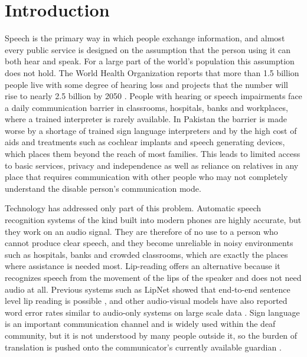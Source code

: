 \documentclass{FastFyp}
\begin{document}
\mainmatter


\chapter{Introduction}
\label{ch:intro}
Speech is the primary way in which people exchange information, and almost every public service is designed on the assumption that the person using it can both hear and speak. For a large part of the world's population this assumption does not hold. The World Health Organization reports that more than 1.5 billion people live with some degree of hearing loss and projects that the number will rise to nearly 2.5 billion by 2050 \cite{who2021}. People with hearing or speech impairments face a daily communication barrier in classrooms, hospitals, banks and workplaces, where a trained interpreter is rarely available. In Pakistan the barrier is made worse by a shortage of trained sign language interpreters and by the high cost of aids and treatments such as cochlear implants and speech generating devices, which places them beyond the reach of most families.
This leads to limited access to basic services, privacy and independence as well as reliance on relatives in any place that requires communication with other people who may not completely understand the disable person's communication mode.

Technology has addressed only part of this problem. Automatic speech recognition systems of the kind built into modern phones are highly accurate, but they work on an audio signal. They are therefore of no use to a person who cannot produce clear speech, and they become unreliable in noisy environments such as hospitals, banks and crowded classrooms, which are exactly the places where assistance is needed most. 
Lip-reading offers an alternative because it recognizes speech from the movement of the lips of the speaker and does not need audio at all. Previous systems such as LipNet showed that end-to-end sentence level lip reading is possible \cite{assael2016lipnet,cooke2006grid}, and other audio-visual models have also reported word error rates similar to audio-only systems on large scale data \cite{ref:Afouras:2018}. 
Sign language is an important communication channel and is widely used within the deaf community, but it is not understood by many people outside it, so the burden of translation is pushed onto the communicator's currently available guardian \cite{koller2016deepsign}.
\end{document}
